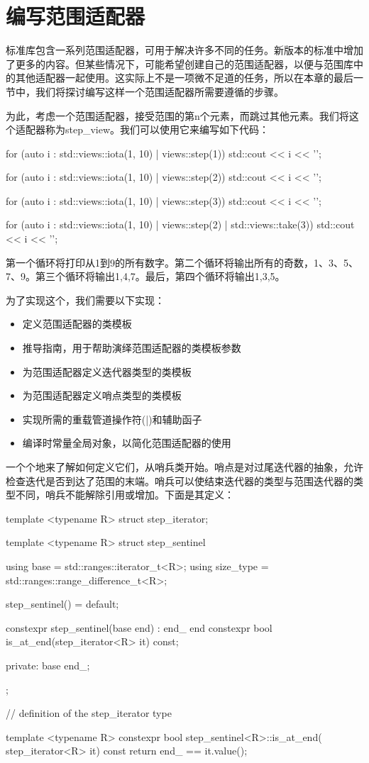 \section{编写范围适配器}
标准库包含一系列范围适配器，可用于解决许多不同的任务。新版本的标准中增加了更多的内容。但某些情况下，可能希望创建自己的范围适配器，以便与范围库中的其他适配器一起使用。这实际上不是一项微不足道的任务，所以在本章的最后一节中，我们将探讨编写这样一个范围适配器所需要遵循的步骤。

为此，考虑一个范围适配器，接受范围的第n个元素，而跳过其他元素。我们将这个适配器称为step\_view。我们可以使用它来编写如下代码：

\begin{cpp}
for (auto i : std::views::iota(1, 10) | views::step(1))
	std::cout << i << '\n';

for (auto i : std::views::iota(1, 10) | views::step(2))
	std::cout << i << '\n';

for (auto i : std::views::iota(1, 10) | views::step(3))
	std::cout << i << '\n';

for (auto i : std::views::iota(1, 10) | views::step(2) | 	
				std::views::take(3))
	std::cout << i << '\n';
\end{cpp}

第一个循环将打印从1到9的所有数字。第二个循环将输出所有的奇数，1、3、5、7、9。第三个循环将输出1,4,7。最后，第四个循环将输出1,3,5。

为了实现这个，我们需要以下实现：

\begin{itemize}
  \item 定义范围适配器的类模板
  \item 推导指南，用于帮助演绎范围适配器的类模板参数
  \item 为范围适配器定义迭代器类型的类模板
  \item 为范围适配器定义哨点类型的类模板
  \item 实现所需的重载管道操作符(|)和辅助函子
  \item 编译时常量全局对象，以简化范围适配器的使用
\end{itemize}

一个个地来了解如何定义它们，从哨兵类开始。哨点是对过尾迭代器的抽象，允许检查迭代是否到达了范围的末端。哨兵可以使结束迭代器的类型与范围迭代器的类型不同，哨兵不能解除引用或增加。下面是其定义：

\begin{cpp}
template <typename R>
struct step_iterator;

template <typename R>
struct step_sentinel
{
	using base = std::ranges::iterator_t<R>;
	using size_type = std::ranges::range_difference_t<R>;
	
	step_sentinel() = default;
	
	constexpr step_sentinel(base end) : end_{ end } {}
	constexpr bool is_at_end(step_iterator<R> it) const;
	
private:
	base end_;
};

// definition of the step_iterator type

template <typename R>
constexpr bool step_sentinel<R>::is_at_end(
	step_iterator<R> it) const
{
	return end_ == it.value();
}
\end{cpp}

